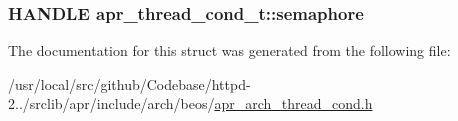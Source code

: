 \subsubsection[{\texorpdfstring{semaphore}{semaphore}}]{\setlength{\rightskip}{0pt plus 5cm}H\+A\+N\+D\+LE apr\+\_\+thread\+\_\+cond\+\_\+t\+::semaphore}\hypertarget{structapr__thread__cond__t_a9351e58b30537e3a784a2614e25f503a}{}\label{structapr__thread__cond__t_a9351e58b30537e3a784a2614e25f503a}


The documentation for this struct was generated from the following file\+:\begin{DoxyCompactItemize}
\item 
/usr/local/src/github/\+Codebase/httpd-\/2../srclib/apr/include/arch/beos/\hyperlink{beos_2apr__arch__thread__cond_8h}{apr\+\_\+arch\+\_\+thread\+\_\+cond.\+h}\end{DoxyCompactItemize}

